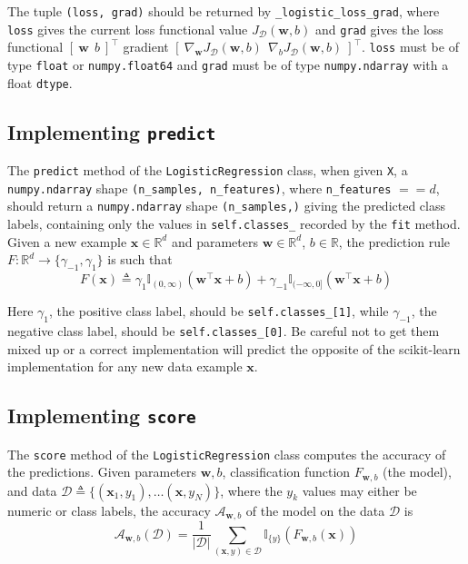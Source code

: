 \documentclass{article}
\numberwithin{equation}{section}
\newcommand{\loglossgrad}{\texttt{\_logistic\_loss\_grad}}
\begin{document}
\medskip

The tuple \texttt{(loss, grad)} should be returned by \loglossgrad{}, where
\texttt{loss} gives the current loss functional value
$ J_\mathcal{D}(\mathbf{w}, b) $ and \texttt{grad} gives the loss functional
$ [ \ \mathbf{w} \ \ b \ ]^\top $ gradient
$ [ \ \nabla_\mathbf{w}J_\mathcal{D}(\mathbf{w}, b) \ \
\nabla_bJ_\mathcal{D}(\mathbf{w}, b)\ ]^\top $. \texttt{loss} must be of
type \texttt{float} or \texttt{numpy.float64} and \texttt{grad} must be of
type \texttt{numpy.ndarray} with a float \texttt{dtype}.

\subsection{Implementing \texttt{predict}}

The \texttt{predict} method of the \texttt{LogisticRegression} class, when
given \texttt{X}, a \texttt{numpy.ndarray} shape
\texttt{(n\_samples, n\_features)}, where \texttt{n\_features} $ == d $,
should return a \texttt{numpy.ndarray} shape \texttt{(n\_samples,)} giving the
predicted class labels, containing only the values in \texttt{self.classes\_}
recorded by the \texttt{fit} method. Given a new example $ \mathbf{x} \in
\mathbb{R}^d $ and parameters $\mathbf{w} \in \mathbb{R}^d $, $ b \in
\mathbb{R} $, the prediction rule $ F : \mathbb{R}^d \rightarrow
\{\gamma_{-1}, \gamma_1\} $ is such that
\begin{equation*}
    F(\mathbf{x}) \triangleq \gamma_1\mathbb{I}_{(0, \infty)}
        \left(\mathbf{w}^\top\mathbf{x} + b\right) +
        \gamma_{-1}\mathbb{I}_{(-\infty, 0]}
        \left(\mathbf{w}^\top\mathbf{x} + b\right)
\end{equation*}

Here $ \gamma_1 $, the positive class label, should be
\texttt{self.classes\_[1]}, while $ \gamma_{-1} $, the negative class label,
should be \texttt{self.classes\_[0]}. Be careful not to get them mixed up or
a correct implementation will predict the opposite of the scikit-learn
implementation for any new data example $ \mathbf{x} $.

\subsection{Implementing \texttt{score}}

The \texttt{score} method of the \texttt{LogisticRegression} class computes
the accuracy of the predictions. Given parameters $ \mathbf{w}, b $,
classification function $ F_{\mathbf{w}, b} $ (the model), and data
$ \mathcal{D} \triangleq \{(\mathbf{x}_1, y_1), \ldots (\mathbf{x}, y_N)\} $,
where the $ y_k $ values may either be numeric or class labels, the accuracy
$ \mathcal{A}_{\mathbf{w}, b} $ of the model on the data $ \mathcal{D} $ is
\begin{equation*}
    \mathcal{A}_{\mathbf{w}, b}(\mathcal{D}) = \frac{1}{|\mathcal{D}|}
        \sum_{(\mathbf{x}, y) \in \mathcal{D}}\mathbb{I}_{\{y\}}\left(
            F_{\mathbf{w}, b}(\mathbf{x})
        \right)
\end{equation*}
\end{document}
